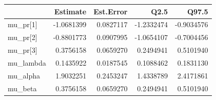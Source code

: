 
\begin{tabular}{lrrrr}
\toprule
  & Estimate & Est.Error & Q2.5 & Q97.5\\
\midrule
mu\_pr[1] & -1.0681399 & 0.0827117 & -1.2332474 & -0.9034576\\
mu\_pr[2] & -0.8801773 & 0.0907995 & -1.0654107 & -0.7004456\\
mu\_pr[3] & 0.3756158 & 0.0659270 & 0.2494941 & 0.5101940\\
mu\_lambda & 0.1435922 & 0.0187545 & 0.1088462 & 0.1831130\\
mu\_alpha & 1.9032251 & 0.2453247 & 1.4338789 & 2.4171861\\
\addlinespace
mu\_beta & 0.3756158 & 0.0659270 & 0.2494941 & 0.5101940\\
\bottomrule
\end{tabular}
